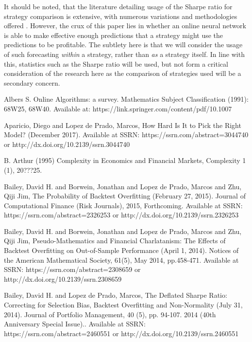 \documentclass[a4paper,latin]{paper}
\begin{document}
It should be noted, that the literature detailing usage of the Sharpe ratio for strategy comparison is extensive, with 
numerous variations and methodologies offered \cite{BaileySharpe}. However, the crux of this paper lies 
in whether an online neural network is able to make effective enough predictions that a strategy might use the 
predictions to be profitable. The subtlety here is that we will consider the usage of such forecasting \textit{within} a strategy,
 rather than \textit{as} a strategy itself. In line with this, statistics such as the Sharpe ratio will be used, but not form a critical 
 consideration of the research here as the comparison of strategies used will be a secondary concern.
\hfill \break 

\newpage
\begin{thebibliography}{9}

Albers S. Online Algorithms: a survey. Mathematics Subject Classification (1991): 68W25, 
68W40. Available at: https://link.springer.com/content/pdf/10.1007%

Aparicio, Diego and Lopez de Prado, Marcos, How Hard Is It to Pick the Right Model? (December 2017). Available at SSRN: https://ssrn.com/abstract=3044740 or http://dx.doi.org/10.2139/ssrn.3044740

B. Arthur (1995) Complexity in Economics and Financial Markets, Complexity 1 (1), 20???25.

Bailey, David H. and Borwein, Jonathan and Lopez de Prado, Marcos and Zhu, Qiji Jim, The Probability of Backtest Overfitting (February 27, 2015). Journal of Computational Finance (Risk Journals), 2015, Forthcoming. Available at SSRN: https://ssrn.com/abstract=2326253 or http://dx.doi.org/10.2139/ssrn.2326253

Bailey, David H. and Borwein, Jonathan and Lopez de Prado, Marcos and Zhu, Qiji Jim, Pseudo-Mathematics and Financial Charlatanism: The Effects of Backtest Overfitting on Out-of-Sample Performance (April 1, 2014). Notices of the American Mathematical Society, 61(5), May 2014, pp.458-471. Available at SSRN: https://ssrn.com/abstract=2308659 or http://dx.doi.org/10.2139/ssrn.2308659

Bailey, David H. and Lopez de Prado, Marcos, The Deflated Sharpe Ratio: Correcting for Selection Bias, Backtest Overfitting and Non-Normality (July 31, 2014). Journal of Portfolio Management, 40 (5), pp. 94-107. 2014 (40th Anniversary Special Issue).. Available at SSRN: https://ssrn.com/abstract=2460551 or http://dx.doi.org/10.2139/ssrn.2460551


\end{thebibliography}
\end{document}
